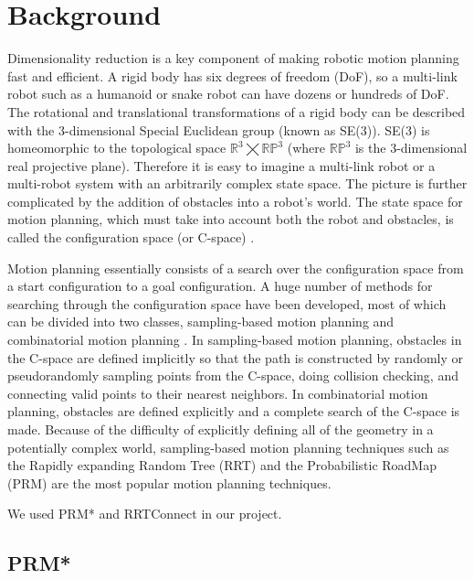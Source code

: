 \documentclass[12pt]{article}
\begin{document}
\maketitle

\section{Background}

Dimensionality reduction is a key component of making robotic motion planning
fast and efficient. A rigid body has six degrees of freedom (DoF), so a
multi-link robot such as a humanoid or snake robot can have dozens or hundreds
of DoF. The rotational and translational transformations of a rigid body can be
described with the 3-dimensional Special Euclidean group (known as SE(3)).
SE(3) is homeomorphic to the topological space
$\mathbb{R}^3\bigtimes\mathbb{RP}^3$ (where $\mathbb{RP}^3$ is the
3-dimensional real projective plane). Therefore it is easy to imagine a
multi-link robot \cite{kuindersma2015optimization} or a multi-robot system
\cite{alonso2015multi} with an arbitrarily complex state space. The picture is
further complicated by the addition of obstacles into a robot's world. The
state space for motion planning, which must take into account both the robot
and obstacles, is called the configuration space (or C-space)
\cite{lozano1983spatial}. 

Motion planning essentially consists of a search over the configuration space
from a start configuration to a goal configuration. A huge number of methods
for searching through the configuration space have been developed, most of
which can be divided into two classes, sampling-based motion planning and
combinatorial motion planning \cite{lavalle2006planning}. In sampling-based
motion planning, obstacles in the C-space are defined implicitly so that the
path is constructed by randomly or pseudorandomly sampling points from the
C-space, doing collision checking, and connecting valid points to their nearest
neighbors. In combinatorial motion planning, obstacles are defined explicitly
and a complete search of the C-space is made. Because of the difficulty of
explicitly defining all of the geometry in a potentially complex world,
sampling-based motion planning techniques such as the Rapidly expanding Random
Tree (RRT) and the Probabilistic RoadMap (PRM) are the most popular motion
planning techniques.

We used PRM* and RRTConnect in our project. 

\subsection{PRM*}
\end{document}
